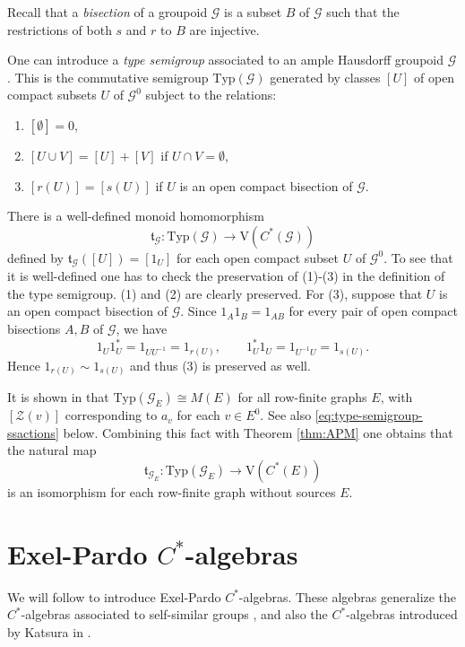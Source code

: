 \documentclass[11pt]{amsart}
\theoremstyle{plain}            %
\theoremstyle{definition}       %
\theoremstyle{definition}       %
\theoremstyle{remark}
\newcommand{\V}{\mathrm{V}}
\newcommand{\Typ}{\mathrm{Typ}}
\begin{document}
Recall that a {\it bisection} of a groupoid $\mathcal G$ is a subset $B$ of $\mathcal G $ such that the restrictions of both $s$ and $r$ to $B$ are injective. 


One can introduce a {\it type semigroup} associated to an ample Hausdorff groupoid $\mathcal G$. This is the commutative semigroup $\Typ (\mathcal G)$ generated by classes $[U]$ of open compact subsets $U$ of $\mathcal G^0$ subject to the relations:
\begin{enumerate}
	\item $ [\emptyset] = 0$, 
	\item $[U\cup V] = [U]+ [V]$ if $U\cap V=\emptyset$,
	\item $[r(U)]= [s(U)]$ if $U$ is an open compact bisection of $\mathcal G$. 
\end{enumerate}

There is a well-defined monoid homomorphism
$$\mathfrak{t}_{\mathcal G} \colon \Typ (\mathcal G) \to \V (C^*(\mathcal G))$$
defined by $\mathfrak{t}_{\mathcal G} ([U]) = [1_U]$ for each open compact subset $U$ of $\mathcal G^0$.
To see that it is well-defined one has to check the preservation of (1)-(3) in the definition of the type semigroup. (1) and (2) are clearly preserved. For (3), suppose that $U$ is an open compact bisection of $\mathcal G$. Since $1_A1_B= 1_{AB}$ for every pair of open compact bisections $A,B$ of $\mathcal G$, we have
$$1_U1_U^* = 1_{UU^{-1}}= 1_{r(U)},\qquad 1_U^* 1_U = 1_{U^{-1}U} = 1_{s(U)}.$$
Hence $1_{r(U)}\sim 1_{s(U)}$ and thus (3) is preserved as well. 

It is shown in \cite{KMP25} that $\Typ (\mathcal G_E )\cong M(E)$ for all row-finite graphs $E$, with $ [\mathcal Z (v)]$ corresponding to $a_v$ for each $v\in E^0$. See also \eqref{eq:type-semigroup-ssactions} below. Combining this fact with Theorem \ref{thm:APM} one obtains that the natural map
$$ \mathfrak{t}_{\mathcal G_E} \colon \Typ (\mathcal G_E) \to \V (C^*(E))$$
is an isomorphism for each row-finite graph without sources $E$. 


\section{Exel-Pardo $C^*$-algebras}
\label{sect:ExelPardo}


We will follow \cite{ep17} to introduce Exel-Pardo $C^*$-algebras. These algebras generalize the $C^*$-algebras associated to self-similar groups \cite{Nekra}, and also the $C^*$-algebras introduced by Katsura in \cite{kat08}.
\end{document}
